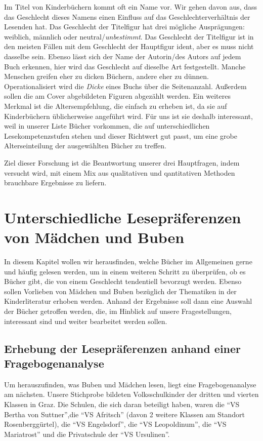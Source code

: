 Im Titel von Kinderbüchern kommt oft ein Name vor. Wir gehen davon aus,
dass das Geschlecht dieses Namens einen Einfluss auf das
Geschlechterverhältnis der Lesenden hat. Das Geschlecht der Titelfigur
hat drei mögliche Ausprägungen: weiblich, männlich oder
neutral/\emph{unbestimmt}. Das Geschlecht der Titelfigur ist in den
meisten Fällen mit dem Geschlecht der Hauptfigur ident, aber es muss
nicht dasselbe sein. Ebenso lässt sich der Name der Autorin/des Autors
auf jedem Buch erkennen, hier wird das Geschlecht auf dieselbe Art
festgestellt. Manche Menschen greifen eher zu dicken Büchern, andere
eher zu dünnen. Operationalisiert wird die \emph{Dicke} eines Buchs über
die Seitenanzahl. Außerdem sollen die am Cover abgebildeten Figuren
abgezählt werden. Ein weiteres Merkmal ist die Altersempfehlung, die
einfach zu erheben ist, da sie auf Kinderbüchern üblicherweise angeführt
wird. Für uns ist sie deshalb interessant, weil in unserer Liste Bücher
vorkommen, die auf unterschiedlichen Lesekompetenzstufen stehen und
dieser Richtwert gut passt, um eine grobe Alterseinteilung der
ausgewählten Bücher zu treffen.

Ziel dieser Forschung ist die Beantwortung unserer drei Hauptfragen,
indem versucht wird, mit einem Mix aus qualitativen und qantitativen
Methoden brauchbare Ergebnisse zu liefern.

\chapter{Unterschiedliche Lesepräferenzen von Mädchen und Buben}

In diesem Kapitel wollen wir herausfinden, welche Bücher im Allgemeinen
gerne und häufig gelesen werden, um in einem weiteren Schritt zu
überprüfen, ob es Bücher gibt, die von einem Geschlecht tendentiell
bevorzugt werden. Ebenso sollen Vorlieben von Mädchen und Buben
bezüglich der Thematiken in der Kinderliteratur erhoben werden. Anhand
der Ergebnisse soll dann eine Auswahl der Bücher getroffen werden, die,
im Hinblick auf unsere Fragestellungen, interessant sind und weiter
bearbeitet werden sollen.

\section{Erhebung der Lesepräferenzen anhand einer Fragebogenanalyse}

Um herauszufinden, was Buben und Mädchen lesen, liegt eine
Fragebogenanalyse am nächsten. Unsere Stichprobe bildeten
Volksschulkinder der dritten und vierten Klassen in Graz. Die Schulen,
die sich daran beteiligt haben, waren die ``VS Bertha von Suttner'',die
``VS Afritsch'' (davon 2 weitere Klassen am Standort Rosenberggürtel),
die ``VS Engelsdorf'', die ``VS Leopoldinum'', die ``VS Mariatrost'' und
die Privatschule der ``VS Ursulinen''.

